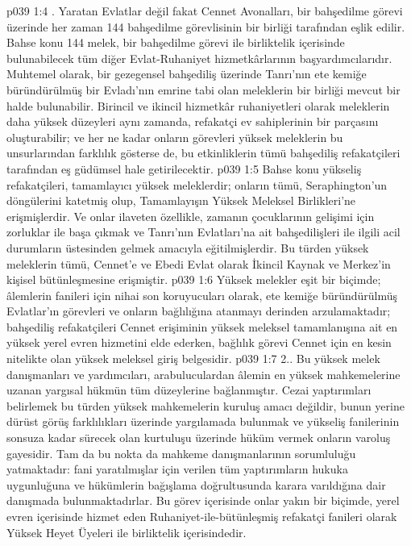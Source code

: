 \vs p039 1:4 . Yaratan Evlatlar değil fakat Cennet Avonalları, bir bahşedilme görevi üzerinde her zaman 144 bahşedilme görevlisinin bir birliği tarafından eşlik edilir. Bahse konu 144 melek, bir bahşedilme görevi ile birliktelik içerisinde bulunabilecek tüm diğer Evlat\hyp{}Ruhaniyet hizmetkârlarının başyardımcılarıdır. Muhtemel olarak, bir gezegensel bahşediliş üzerinde Tanrı’nın ete kemiğe büründürülmüş bir Evladı’nın emrine tabi olan meleklerin bir birliği mevcut bir halde bulunabilir. Birincil ve ikincil hizmetkâr ruhaniyetleri olarak meleklerin daha yüksek düzeyleri aynı zamanda, refakatçi ev sahiplerinin bir parçasını oluşturabilir; ve her ne kadar onların görevleri yüksek meleklerin bu unsurlarından farklılık gösterse de, bu etkinliklerin tümü bahşediliş refakatçileri tarafından eş güdümsel hale getirilecektir.
\vs p039 1:5 Bahse konu yükseliş refakatçileri, tamamlayıcı yüksek meleklerdir; onların tümü, Seraphington’un döngülerini katetmiş olup, Tamamlayışın Yüksek Meleksel Birlikleri’ne erişmişlerdir. Ve onlar ilaveten özellikle, zamanın çocuklarının gelişimi için zorluklar ile başa çıkmak ve Tanrı’nın Evlatları’na ait bahşedilişleri ile ilgili acil durumların üstesinden gelmek amacıyla eğitilmişlerdir. Bu türden yüksek meleklerin tümü, Cennet’e ve Ebedi Evlat olarak İkincil Kaynak ve Merkez’in kişisel bütünleşmesine erişmiştir.
\vs p039 1:6 Yüksek melekler eşit bir biçimde; âlemlerin fanileri için nihai son koruyucuları olarak, ete kemiğe büründürülmüş Evlatlar’ın görevleri ve onların bağlılığına atanmayı derinden arzulamaktadır; bahşediliş refakatçileri Cennet erişiminin yüksek meleksel tamamlanışına ait en yüksek yerel evren hizmetini elde ederken, bağlılık görevi Cennet için en kesin nitelikte olan yüksek meleksel giriş belgesidir.
\vs p039 1:7 2.\bibnobreakspace {}. Bu yüksek melek danışmanları ve yardımcıları, arabuluculardan âlemin en yüksek mahkemelerine uzanan yargısal hükmün tüm düzeylerine bağlanmıştır. Cezai yaptırımları belirlemek bu türden yüksek mahkemelerin kuruluş amacı değildir, bunun yerine dürüst görüş farklılıkları üzerinde yargılamada bulunmak ve yükseliş fanilerinin sonsuza kadar sürecek olan kurtuluşu üzerinde hüküm vermek onların varoluş gayesidir. Tam da bu nokta da mahkeme danışmanlarının sorumluluğu yatmaktadır: fani yaratılmışlar için verilen tüm yaptırımların hukuka uygunluğuna ve hükümlerin bağışlama doğrultusunda karara varıldığına dair danışmada bulunmaktadırlar. Bu görev içerisinde onlar yakın bir biçimde, yerel evren içerisinde hizmet eden Ruhaniyet\hyp{}ile\hyp{}bütünleşmiş refakatçi fanileri olarak Yüksek Heyet Üyeleri ile birliktelik içerisindedir.

